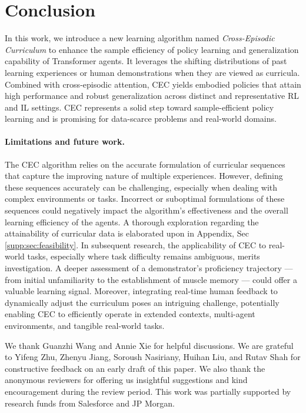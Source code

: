 \documentclass{article}
\newcommand{\para}[1]{\paragraph{#1}\looseness=-1}
\newcommand{\cec}[0]{\mbox{CEC}\xspace}
\begin{document}
\section{Conclusion}
\label{sec:conclusion}
In this work, we introduce a new learning algorithm named \emph{Cross-Episodic Curriculum} to enhance the sample efficiency of policy learning and generalization capability of Transformer agents.
It leverages the shifting distributions of past learning experiences or human demonstrations when they are viewed as curricula.
Combined with cross-episodic attention, \cec yields embodied policies that attain high performance and robust generalization across distinct and representative RL and IL settings.
\cec represents a solid step toward sample-efficient policy learning and is promising for data-scarce problems and real-world domains.
\para{Limitations and future work.}
The CEC algorithm relies on the accurate formulation of curricular sequences that capture the improving nature of multiple experiences. However, defining these sequences accurately can be challenging, especially when dealing with complex environments or tasks. Incorrect or suboptimal formulations of these sequences could negatively impact the algorithm's effectiveness and the overall learning efficiency of the agents.
A thorough exploration regarding the attainability of curricular data is elaborated upon in Appendix, Sec \ref{supp:sec:feasibility}.
In subsequent research, the applicability of \cec to real-world tasks, especially where task difficulty remains ambiguous, merits investigation. A deeper assessment of a demonstrator's proficiency trajectory --- from initial unfamiliarity to the establishment of muscle memory --- could offer a valuable learning signal. Moreover, integrating real-time human feedback to dynamically adjust the curriculum poses an intriguing challenge, potentially enabling \cec to efficiently operate in extended contexts, multi-agent environments, and tangible real-world tasks.
\begin{ack}
We thank Guanzhi Wang and Annie Xie for helpful discussions.
We are grateful to Yifeng Zhu, Zhenyu Jiang, Soroush Nasiriany, Huihan Liu, and Rutav Shah for constructive feedback on an early draft of this paper.
We also thank the anonymous reviewers for offering us insightful suggestions and kind encouragement during the review period.
This work was partially supported by research funds from Salesforce and JP Morgan.
\end{ack}
\newpage
\end{document}
